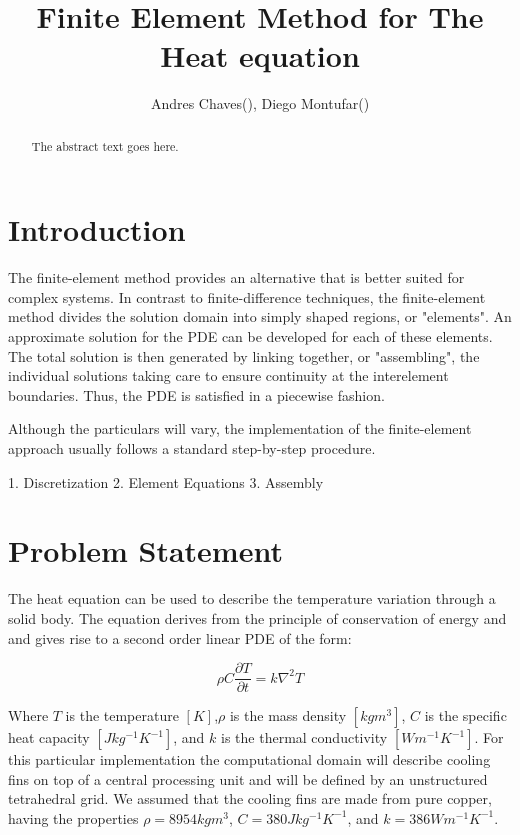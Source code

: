 \documentclass[12pt]{article}
\begin{document}
	
	
	\title{Finite Element Method for The Heat equation}
	\author{Andres Chaves(), Diego Montufar()}
	
	\maketitle
	
	\begin{abstract}
		The abstract text goes here.
	\end{abstract}
	
	\section{Introduction}
	
	The finite-element method provides an alternative that is better suited for complex systems.
In contrast to finite-difference techniques, the finite-element method divides the solution domain into simply shaped regions, or "elements". An approximate solution for the PDE can be developed for each of these elements. The total solution is then generated by linking together, or "assembling", the individual solutions taking care to ensure continuity at the interelement boundaries. Thus, the PDE is satisfied in a piecewise fashion.

Although the particulars will vary, the implementation of the finite-element approach usually follows a standard step-by-step procedure.

1. Discretization
2. Element Equations
3. Assembly
	
	
	\section{Problem Statement}
	
The heat equation can be used to describe the temperature variation through a
solid body. The equation derives from the principle of conservation of energy and
and gives rise to a second order linear PDE of the form:
	
	\begin{equation}\label{eq:equation}
		\rho C \frac{\partial T}{\partial t} = k \nabla^2 T
	\end{equation}
	
Where $T$ is the temperature $[K]$,$\rho$ is the mass density $[kgm^3]$, $C$ is the specific heat capacity $[Jkg^{-1}K^{-1}]$, and $k$ is the thermal conductivity $[Wm^{-1}K^{-1}]$. For this particular implementation the computational domain will describe cooling fins on top of a central processing unit
and will be defined by an unstructured tetrahedral grid. We assumed that the cooling fins are made from pure copper, having the properties $\rho = 8954kgm^3$, $C = 380Jkg^{-1}K^{-1}$, and $k = 386Wm^{-1}K^{-1}$. 
\end{document}

